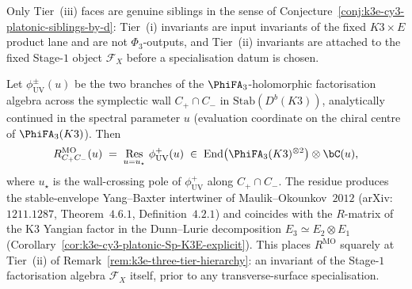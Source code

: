 \begin{remark}
\begin{description}
\end{description}
Only Tier~(iii) faces are genuine siblings in the sense of Conjecture~\ref{conj:k3e-cy3-platonic-siblings-by-d}: Tier~(i) invariants are input invariants of the fixed \(K3\times E\) product lane and are not $\Phi_3$-outputs, and Tier~(ii) invariants are attached to the fixed Stage-$1$ object \(\mathcal F_X\) before a specialisation datum is chosen.
\end{remark}

\begin{theorem}
\label{thm:mo-gluing-cocycle-residue-k3e}
Let $\phi^\pm_{\mathrm{UV}}(u)$ be the two branches of the $\PhiFA_3$-holomorphic factorisation algebra across the symplectic wall $C_+ \cap C_-$ in $\mathrm{Stab}(D^b(K3))$, analytically continued in the spectral parameter $u$ (evaluation coordinate on the chiral centre of $\PhiFA_3(K3)$). Then
\[
 R^{\mathrm{MO}}_{C_+ C_-}(u)
 \;=\; \mathop{\mathrm{Res}}_{u = u_\star}\, \phi^+_{\mathrm{UV}}(u)
 \;\in\; \operatorname{End}\bigl(\PhiFA_3(K3)^{\otimes 2}\bigr) \otimes \bC(u),
\]
where $u_\star$ is the wall-crossing pole of $\phi^+_{\mathrm{UV}}$ along $C_+ \cap C_-$. The residue produces the stable-envelope Yang--Baxter intertwiner of Maulik--Okounkov~$2012$ (arXiv:$1211.1287$, Theorem~$4.6.1$, Definition~$4.2.1$) and coincides with the $R$-matrix of the K3 Yangian factor in the Dunn--Lurie decomposition $E_3 \simeq E_2 \otimes E_1$ (Corollary~\ref{cor:k3e-cy3-platonic-Sp-K3E-explicit}). This places $R^{\mathrm{MO}}$ squarely at Tier~(ii) of Remark~\ref{rem:k3e-three-tier-hierarchy}: an invariant of the Stage-$1$ factorisation algebra $\mathcal{F}_X$ itself, prior to any transverse-surface specialisation.
\end{theorem}

